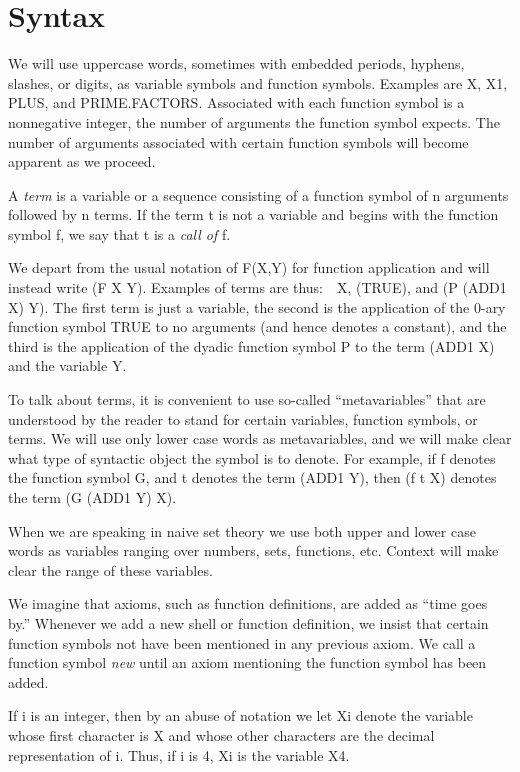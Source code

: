 \documentclass[11pt]{book}
\newcommand{\pubinlineunderline}[1]{\emph{#1}}
\newcommand{\pubdefaulttextsize}{\large}
\begin{document}
\section{Syntax}
\pubdefaulttextsize
\par\pagebreak[0]\hrulefill\nopagebreak\par
We will use uppercase words, sometimes with embedded periods, hyphens, slashes, or digits,
as variable symbols and function symbols.  Examples are X, X1, PLUS, and PRIME.FAC\-TORS.
Associated with each function symbol is a nonnegative integer, the number
of arguments the function symbol expects.  The number of arguments
associated with certain function symbols will become apparent as we proceed.

A \pubinlineunderline{term} is a variable or a sequence consisting of a function symbol
of n arguments followed by n terms.  If the term t is not a variable
and begins with the function symbol f, we say that t is a \pubinlineunderline{call of} f.

We depart from the usual notation of F(X,Y) for
function application and will instead write (F X Y).
Examples of terms are thus:~~X, (TRUE), and (P (ADD1 X) Y).  The first term
is just a variable, the second is the application of the 0-ary
function symbol TRUE to no arguments (and hence denotes a constant),
and the third is the application of the dyadic function symbol P to the
term (ADD1 X) and the variable Y.

To talk about terms, it is convenient  to use so-called
``metavariables'' that are understood by the reader to stand for certain
variables, function symbols, or terms.  We will use
only lower case words as metavariables,  and we will make clear 
what type of syntactic object the symbol is to denote. For example,  if
f  denotes the function symbol G, and
t   denotes the term (ADD1 Y), then (f t X)  denotes the term (G (ADD1 Y) X).

When we are speaking in naive set theory we use both upper and lower case
words as variables ranging over numbers, sets, functions, etc.  Context
will make clear the range of these variables.

We imagine  that axioms, such as function definitions, are added as
``time goes by.''  Whenever we add a new shell or function
definition, we insist that certain function symbols not have been 
mentioned in any previous axiom.   We call a function symbol
\pubinlineunderline{new} until an axiom mentioning the function symbol has been added.

If i is an integer, then by an abuse of notation we let
Xi denote the variable whose
first character is X and whose other characters are the
decimal representation of i.  Thus, if i is 4, Xi is the variable X4.
\end{document}
